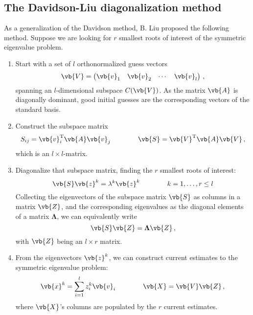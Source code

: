     \subsection{The Davidson-Liu diagonalization method}
        As a generalization of the Davidson method, B. Liu \cite{Liu1978a} proposed the following method. Suppose we are looking for $r$ smallest roots of interest of the symmetric eigenvalue problem.
        \begin{enumerate}
            \item Start with a set of $l$ orthonormalized guess vectors
            \begin{equation}
                \vb{V} = \begin{pmatrix} \vb{v}_1 & \vb{v}_2 & \cdots & \vb{v}_l \end{pmatrix} \thinspace ,
            \end{equation}
            spanning an $l$-dimensional subspace $C(\vb{V})$. As the matrix $\vb{A}$ is diagonally dominant, good initial guesses are the corresponding vectors of the standard basis.

            \item Construct the subspace matrix
            \begin{equation}
                S_{ij} = \vb{v}_i^\text{T} \vb{A} \vb{v}_j \qquad \qquad \vb{S} = \vb{V}^\text{T} \vb{A} \vb{V} \thinspace ,
            \end{equation}
            which is an $l \times l$-matrix.

            \item Diagonalize that subspace matrix, finding the $r$ smallest roots of interest:
            \begin{equation}
                \vb{S} \vb{z}^k = \lambda^k \vb{z}^k \qquad \qquad k=1,\dots,r \leq l
            \end{equation}
            Collecting the eigenvectors of the subspace matrix $\vb{S}$ as columns in a matrix $\vb{Z}$, and the corresponding eigenvalues as the diagonal elements of a matrix $\boldsymbol{\Lambda}$, we can equivalently write
            \begin{equation}
                \vb{S} \vb{Z} = \boldsymbol{\Lambda} \vb{Z} \thinspace ,
            \end{equation}
            with $\vb{Z}$ being an $l \times r$ matrix.

            \item From the eigenvectors $\vb{z}^k$, we can construct current estimates to the symmetric eigenvalue problem:
            \begin{equation}
                \vb{x}^k = \sum_{i=1}^l z_i^k \vb{v}_i \qquad \qquad \vb{X} = \vb{V} \vb{Z} \thinspace ,
            \end{equation}
            where $\vb{X}$'s columns are populated by the $r$ current estimates.


\end{enumerate}
